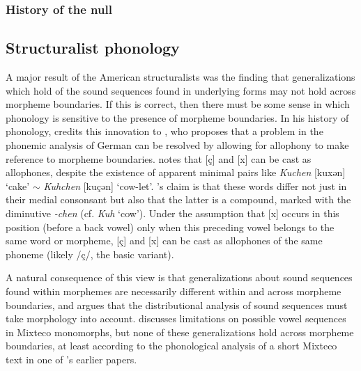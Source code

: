 \subsubsection{History of the null}

\subsection{Structuralist phonology}

A major result of the American structuralists was the finding that generalizations which hold of the sound sequences found in underlying forms may not hold across morpheme boundaries. If this is correct, then there must be some sense in which phonology is sensitive to the presence of morpheme boundaries. In his history of phonology, \citet[][267]{Anderson1985} credits this innovation to \citet{Bloomfield1930}, who proposes that a problem in the phonemic analysis of German can be resolved by allowing for allophony to make reference to morpheme boundaries. \citeauthor{Bloomfield1930} notes that [ç] and [x] can be cast as allophones, despite the existence of apparent minimal pairs like \emph{Kuchen} [ku\lm xən] `cake' $\sim$ \emph{Kuhchen} [ku\lm çən] `cow-let'. \citeauthor{Bloomfield1930}'s claim is that these words differ not just in their medial consonsant but also that the latter is a compound, marked with the diminutive \emph{-chen} (cf. \emph{Kuh} `cow'). Under the assumption that [x] occurs in this position (before a back vowel) only when this preceding vowel belongs to the same word or morpheme, [ç] and [x] can be cast as allophones of the same phoneme (likely /ç/, the basic variant). 

A natural consequence of this view is that generalizations about sound sequences found within morphemes are necessarily different within and across morpheme boundaries, and \citet{Pike1947b} argues that the distributional analysis of sound sequences must take morphology into account. \citeauthor{Pike1947b} discusses limitations on possible vowel sequences in Mixteco monomorphs, but none of these generalizations hold across morpheme boundaries, at least according to the phonological analysis of a short Mixteco text in one of \citeauthor{Pike1944}'s earlier papers.

